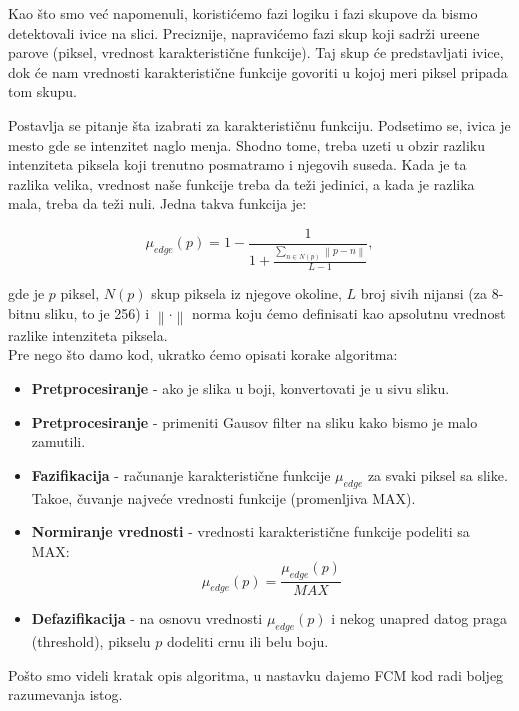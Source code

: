 \documentclass[12pt,a4paper]{article}
\theoremstyle{definition}
\theoremstyle{remark}
\theoremstyle{plain}
\begin{document}
Kao \v sto smo ve\' c napomenuli, koristi\' cemo fazi logiku i fazi skupove da bismo detektovali ivice na slici. Preciznije, napravi\' cemo fazi skup koji sadr\v zi ure\dj ene parove (piksel, vrednost karakteristi\v cne funkcije). Taj skup \' ce predstavljati ivice, dok \' ce nam vrednosti karakteristi\v cne funkcije govoriti u kojoj meri piksel pripada tom skupu.

Postavlja se pitanje \v sta izabrati za karakteristi\v cnu funkciju. Podsetimo se, ivica je mesto gde se intenzitet naglo menja. Shodno tome, treba uzeti u obzir razliku intenziteta piksela koji trenutno posmatramo i njegovih suseda. Kada je ta razlika velika, vrednost na\v se funkcije treba da te\v zi jedinici, a kada je razlika mala, treba da te\v zi nuli. Jedna takva funkcija je:

\begin{equation}
  \mu_{edge}(p) = 1 - \frac{1}{1+\frac{\sum_{n\in N(p)}\left\|p-n\right\|}{L-1}},
\end{equation}

gde je $p$ piksel, $N(p)$ skup piksela iz njegove okoline, $L$ broj sivih nijansi (za 8-bitnu sliku, to je 256) i $\left\| \cdot \right\|$ norma koju \' cemo definisati kao apsolutnu vrednost razlike intenziteta piksela.\\

Pre nego \v sto damo kod, ukratko \' cemo opisati korake algoritma:
\begin{itemize}
  \item \textbf{Pretprocesiranje} - ako je slika u boji, konvertovati je u sivu sliku.
  \item \textbf{Pretprocesiranje} - primeniti Gausov filter na sliku kako bismo je malo zamutili.
  \item \textbf{Fazifikacija} - ra\v cunanje karakteristi\v cne funkcije $\mu_{edge}$ za svaki piksel sa slike. Tako\dj e, \v cuvanje najve\' ce vrednosti funkcije (promenljiva MAX).
  \item \textbf{Normiranje vrednosti} - vrednosti karakteristi\v cne funkcije podeliti sa MAX:
    \begin{equation*}
      \mu_{edge}(p) = \frac{\mu_{edge}(p)}{MAX}
    \end{equation*}
  \item \textbf{Defazifikacija} - na osnovu vrednosti $\mu_{edge}(p)$ i nekog unapred datog praga (threshold), pikselu $p$ dodeliti crnu ili belu boju.
\end{itemize}

Po\v sto smo videli kratak opis algoritma, u nastavku dajemo FCM kod radi boljeg razumevanja istog.
\end{document}
